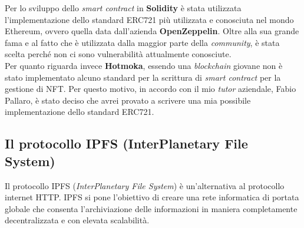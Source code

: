 
Per lo sviluppo dello \textit{smart contract} in \textbf{Solidity} è stata utilizzata l'implementazione dello standard ERC721 più utilizzata e conosciuta nel mondo Ethereum, ovvero quella data dall'azienda \textbf{OpenZeppelin}. Oltre alla sua grande fama e al fatto che è utilizzata dalla maggior parte della \textit{community}, è stata scelta perché non ci sono vulnerabilità attualmente conosciute. \\

Per quanto riguarda invece \textbf{Hotmoka}, essendo una \textit{blockchain} giovane non è stato implementato alcuno standard per la scrittura di \textit{smart contract} per la gestione di NFT. Per questo motivo, in accordo con il mio \textit{tutor} aziendale, Fabio Pallaro, è stato deciso che avrei provato a scrivere una mia possibile implementazione dello standard ERC721.


\subsection{Il protocollo IPFS (InterPlanetary File System)}
Il protocollo IPFS (\textit{InterPlanetary File System}) è un'alternativa al protocollo internet HTTP. IPFS si pone l'obiettivo di creare una rete informatica di portata globale che consenta l'archiviazione delle informazioni in maniera completamente decentralizzata e con elevata scalabilità. \\


